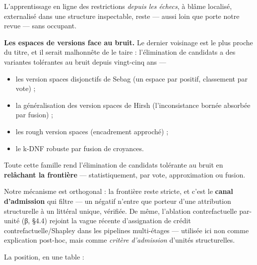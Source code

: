 \documentclass[11pt]{article}
\begin{document}
L'apprentissage en ligne des restrictions \emph{depuis les échecs}, à blâme localisé, externalisé dans une structure inspectable, reste — aussi loin que porte notre revue — sans occupant.

\textbf{Les espaces de versions face au bruit.} Le dernier voisinage est le plus proche du titre, et il serait malhonnête de le taire : l'élimination de candidats a des variantes tolérantes au bruit depuis vingt-cinq ans —

\begin{itemize}
\item les version spaces disjonctifs de Sebag (un espace par positif, classement par vote) ;
\item la généralisation des version spaces de Hirsh (l'inconsistance bornée absorbée par fusion) ;
\item les rough version spaces (encadrement approché) ;
\item le k-DNF robuste par fusion de croyances.
\end{itemize}

Toute cette famille rend l'élimination de candidats tolérante au bruit en \textbf{relâchant la frontière} — statistiquement, par vote, approximation ou fusion.

Notre mécanisme est orthogonal : la frontière reste stricte, et c'est le \textbf{canal d'admission} qui filtre — un négatif n'entre que porteur d'une attribution structurelle à un littéral unique, vérifiée. De même, l'ablation contrefactuelle par-unité (β, §4.4) rejoint la vague récente d'assignation de crédit contrefactuelle/Shapley dans les pipelines multi-étages — utilisée ici non comme explication post-hoc, mais comme \emph{critère d'admission} d'unités structurelles.

La position, en une table :
\end{document}
